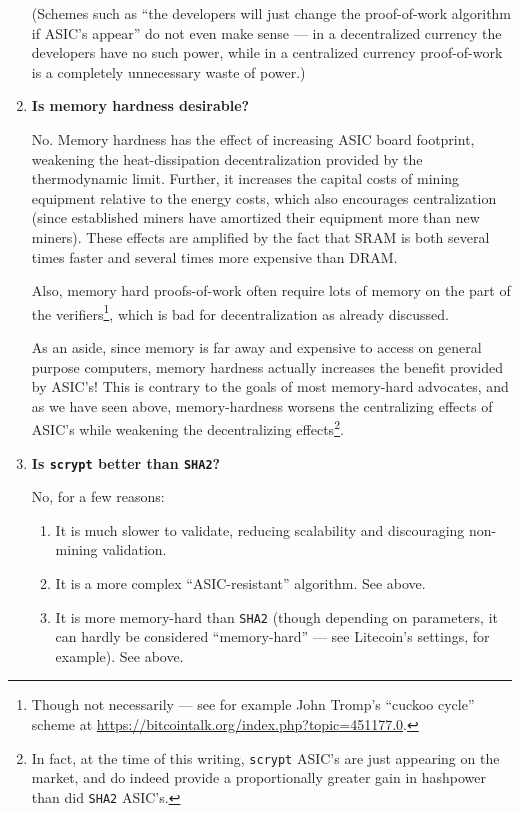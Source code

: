 \documentclass[letterpaper]{article}
\theoremstyle{xxx}
\theoremstyle{evil}
\theoremstyle{yyy}
\theoremstyle{plain}
\theoremstyle{zzz}
\begin{document}
\begin{enumerate}
(Schemes such as ``the developers will just change the proof-of-work
algorithm if ASIC's appear'' do not even make sense --- in a decentralized
currency the developers have no such power, while in a centralized
currency proof-of-work is a completely unnecessary waste of power.)

\item \textbf{Is memory hardness desirable?}

No. Memory hardness has the effect of increasing ASIC board footprint,
weakening the heat-dissipation decentralization provided by the
thermodynamic limit. Further, it increases the capital costs of
mining equipment relative to the energy costs, which also encourages
centralization (since established miners have amortized their equipment
more than new miners). These effects are amplified by the fact that
SRAM is both several times faster and several times more expensive
than DRAM.

Also, memory hard proofs-of-work often require lots of memory on the
part of the verifiers\footnote{Though not necessarily --- see for example
John Tromp's ``cuckoo cycle'' scheme at \url{https://bitcointalk.org/index.php?topic=451177.0}.},
which is bad for decentralization as already discussed.

As an aside, since memory is far away and expensive to access on general
purpose computers, memory hardness actually increases the benefit provided
by ASIC's! This is contrary to the goals of most memory-hard advocates,
and as we have seen above, memory-hardness worsens the centralizing effects
of ASIC's while weakening the decentralizing effects\footnote{In fact, at
the time of this writing, \texttt{scrypt} ASIC's are just appearing on the
market, and do indeed provide a proportionally greater gain in hashpower
than did \texttt{SHA2} ASIC's.}.

\item \textbf{Is \texttt{scrypt} better than \texttt{SHA2}?}

No, for a few reasons:
\begin{enumerate}
\item It is much slower to validate, reducing scalability and discouraging
non-mining validation.
\item It is a more complex ``ASIC-resistant'' algorithm. See above.
\item It is more memory-hard than \texttt{SHA2} (though depending on parameters,
it can hardly be considered ``memory-hard'' --- see Litecoin's settings, for
example). See above.
\end{enumerate}


\end{enumerate}
\end{document}
